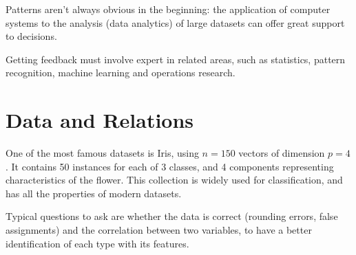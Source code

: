 Patterns aren't always obvious in the beginning: the application of computer systems to the analysis (data analytics) of large datasets can offer great support to decisions.

Getting feedback must involve expert in related areas, such as statistics, pattern recognition, machine learning and operations research.

\section{Data and Relations}
One of the most famous datasets is Iris, using $n = 150$ vectors of dimension $p = 4$.
It contains 50 instances for each of 3 classes, and 4 components representing characteristics of the flower. This collection is widely used for classification, and has all the properties of modern datasets. 

Typical questions to ask are whether the data is correct (rounding errors, false assignments) and the correlation between two variables, to have a better identification of each type with its features. 